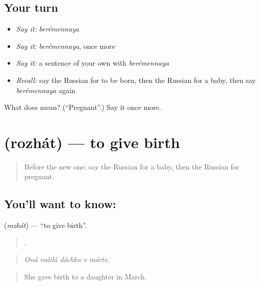 \subsection*{Your turn}
\begin{itemize}
\raggedright
  \item \emph{Say it:} \emph{berémennaya}
  \item \emph{Say it:} \emph{berémennaya}, once more
  \item \emph{Say it:} a sentence of your own with \emph{berémennaya}
  \item \emph{Recall:} say the Russian for to be born, then the Russian for a baby, then say \emph{berémennaya} again
\end{itemize}

\begin{tcolorbox}[breakable,colback=teal!4,colframe=teal!35!black,title={Before you move on}]
What does  mean? (\textquotedblleft{}Pregnant\textquotedblright{}.) Say it once more.
\end{tcolorbox}
\section[\texorpdfstring{\ru{рожать} (rozhát)}{рожать (rozhát)}]{ (rozhát) — to give birth}

\label{lesson:RU-C303-rozhat}



\begin{quote}
Before the new one: say the Russian for a baby, then the Russian for pregnant.
\end{quote}

\subsection*{You'll want to know: }
\textbf{} (\emph{rozhát}) — \textquotedblleft{}to give birth\textquotedblright{}.

\begin{quote}
    .
\end{quote}

\begin{quote}
\emph{Oná rodilá dóchku v márte.}
\end{quote}

\begin{quote}
She gave birth to a daughter in March.
\end{quote}

